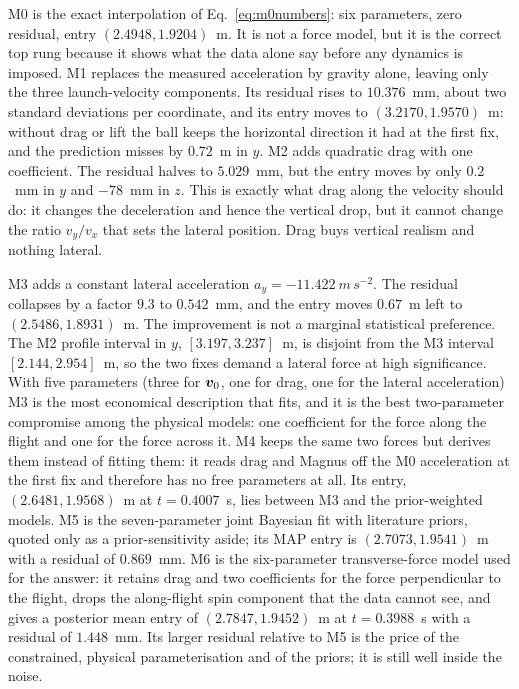 M0 is the exact interpolation of Eq.~\eqref{eq:m0numbers}: six parameters, zero
residual, entry $(2.4948,1.9204)$~m. It is not a force model, but it is the
correct top rung because it shows what the data alone say before any dynamics is
imposed. M1 replaces the measured acceleration by gravity alone, leaving only the
three launch-velocity components. Its residual rises to $10.376$~mm, about two
standard deviations per coordinate, and its entry moves to
$(3.2170,1.9570)$~m: without drag or lift the ball keeps the horizontal direction
it had at the first fix, and the prediction misses by $0.72$~m in $y$. M2 adds
quadratic drag with one coefficient. The residual halves to $5.029$~mm, but the
entry moves by only $0.2$~mm in $y$ and $-78$~mm in $z$. This is exactly what
drag along the velocity should do: it changes the deceleration and hence the
vertical drop, but it cannot change the ratio $v_y/v_x$ that sets the lateral
position. Drag buys vertical realism and nothing lateral.

M3 adds a constant lateral acceleration $a_y=-11.422~\si{m\,s^{-2}}$. The
residual collapses by a factor $9.3$ to $0.542$~mm, and the entry moves
$0.67$~m left to $(2.5486,1.8931)$~m. The improvement is not a marginal
statistical preference. The M2 profile interval in $y$, $[3.197,3.237]$~m, is
disjoint from the M3 interval $[2.144,2.954]$~m, so the two fixes demand a
lateral force at high significance. With five parameters (three for $\bm{v}_0$,
one for drag, one for the lateral acceleration) M3 is the most economical
description that fits, and it is the best two-parameter compromise among the
physical models: one coefficient for the force along the flight and one for the
force across it. M4 keeps the same two forces but derives them instead of fitting
them: it reads drag and Magnus off the M0 acceleration at the first fix and
therefore has no free parameters at all. Its entry, $(2.6481,1.9568)$~m at
$t=0.4007$~s, lies between M3 and the prior-weighted models. M5 is the
seven-parameter joint Bayesian fit with literature priors, quoted only as a
prior-sensitivity aside; its MAP entry is $(2.7073,1.9541)$~m with a residual of
$0.869$~mm. M6 is the six-parameter transverse-force model used for the answer:
it retains drag and two coefficients for the force perpendicular to the flight,
drops the along-flight spin component that the data cannot see, and gives a
posterior mean entry of $(2.7847,1.9452)$~m at $t=0.3988$~s with a residual of
$1.448$~mm. Its larger residual relative to M5 is the price of the constrained,
physical parameterisation and of the priors; it is still well inside the noise.


